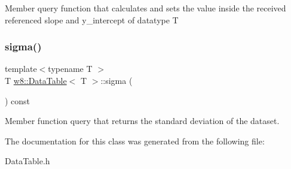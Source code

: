 Member query function that calculates and sets the value inside the received referenced slope and y\+\_\+intercept of datatype T \mbox{\label{classw8_1_1DataTable_a0117321b63383aa310a9034662e25d8b}} 
\subsubsection{\texorpdfstring{sigma()}{sigma()}}
{\footnotesize\ttfamily template$<$typename T $>$ \\
T \mbox{\hyperlink{classw8_1_1DataTable}{w8\+::\+Data\+Table}}$<$ T $>$\+::sigma (\begin{DoxyParamCaption}{ }\end{DoxyParamCaption}) const\hspace{0.3cm}{\ttfamily [inline]}}

Member function query that returns the standard deviation of the dataset. 

The documentation for this class was generated from the following file\+:\begin{DoxyCompactItemize}
\item 
Data\+Table.\+h\end{DoxyCompactItemize}
